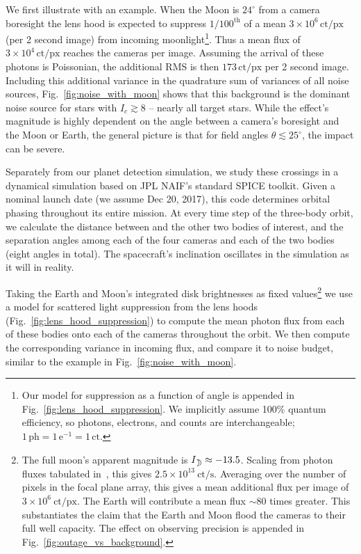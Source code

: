 We first illustrate with an example.
When the Moon is $24^\circ$ from a camera boresight the lens hood 
is expected to suppress $1/100^\mathrm{th}$ of a mean 
$3\times10^6\,\mathrm{ct/px}$ (per 2 second image) from incoming 
moonlight\footnote{Our model for suppression as a function of angle is 
appended in Fig.~\ref{fig:lens_hood_suppression}. We implicitly assume 100\% 
quantum efficiency, so photons, electrons, and counts are interchangeable; 
$1\,\mathrm{ph} = 1\,\mathrm{e^{-1}} = 1\,\mathrm{ct}$.}.
Thus a mean flux of $3\times10^4\,\mathrm{ct/px}$ reaches the cameras per 
image. 
Assuming the arrival of these photons is Poissonian, the additional RMS is 
then $173\,\mathrm{ct/px}$ per 2 second image.
Including this additional variance in the quadrature sum of variances of all 
noise sources, Fig.~\ref{fig:noise_with_moon} shows that this background 
is the dominant noise source for stars with $I_c \gtrsim 8$ -- nearly all 
target stars.
While the effect's magnitude is highly dependent on the angle between a 
camera's
boresight and the Moon or Earth, the general picture is that for field angles 
$\theta \lesssim25^{\circ}$, the impact can be severe.

Separately from our planet detection simulation, we study these 
crossings in a dynamical simulation based on JPL NAIF's standard SPICE toolkit.
Given a nominal launch date (we assume Dec 20, 2017), this code determines 
\tesss orbital phasing throughout its entire mission. 
At every time step of the three-body orbit, we calculate the distance between 
\tess and the other two bodies of interest, and the separation angles among 
each of the four cameras and each of the two bodies (eight angles in total). 
The spacecraft's inclination oscillates in the simulation as it will in 
reality.

Taking the Earth and Moon's integrated disk brightnesses as fixed 
values\footnote{The full moon's apparent magnitude is $I_\moon \approx -13.5$. 
Scaling from photon fluxes tabulated in~\citet{winn_photonflux_2013}, this 
gives $2.5\times10^{13}\ \mathrm{ct/s}$. Averaging over the number of pixels 
in the focal plane array, 
this gives a mean additional flux per image of $3\times10^6\ \mathrm{ct/px}$.
The Earth will contribute a mean flux $\sim {80}$ times greater.
This substantiates the claim that the Earth and Moon flood the cameras to 
their full well capacity. 
The effect on observing precision is appended in 
Fig.~\ref{fig:outage_vs_background}.} we use a model for scattered light 
suppression from 
the \tess lens hoods (Fig.~\ref{fig:lens_hood_suppression}) to compute the 
mean photon flux from each of these bodies onto each of the cameras throughout 
the orbit. We then compute the corresponding variance in incoming flux, and 
compare it to \tesss noise budget, similar to the example in 
Fig.~\ref{fig:noise_with_moon}.

